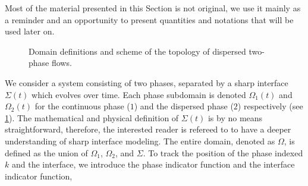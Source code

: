 Most of the material presented in this Section is not original, we use it mainly as
a reminder and an opportunity to present quantities and notations that will be
used later on.
\begin{figure}[h!]
    \centering
    \caption{Domain definitions and scheme of the topology of dispersed two-phase flows.}
    \label{fig:Scheme}
\end{figure}
We consider a system consisting of two phases, separated by a sharp interface $\Sigma(t)$ which evolves over time. 
Each phase subdomain is denoted $\Omega_1(t)$ and $\Omega_2(t)$ for the continuous phase ($1$) and the dispersed phase ($2$) respectively (see \ref{fig:Scheme}). 
The mathematical and physical definition of $\Sigma(t)$ is by no means straightforward, therefore, the interested reader is refereed to \cite{bothe2022sharp} to have a deeper understanding of sharp interface modeling. 
The entire domain, denoted as $\Omega$, is defined as the union of $\Omega_1$, $\Omega_2$, and $\Sigma$.
To track the position of the phase indexed $k$ and the interface, we introduce the phase indicator function and the interface indicator function, 
